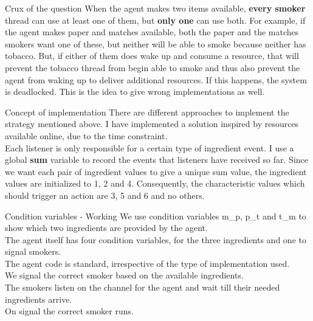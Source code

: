 \documentclass[dvipsnames]{beamer}
\theoremstyle{definition}
\begin{document}
\begin{frame}{Crux of the question}
When the agent makes two items available, \textbf{every smoker} thread can use at least one of them, but \textbf{only one} can use both. For example, if the agent makes paper and matches available, both the paper and the matches smokers want one of these, but neither will be able to smoke because neither has tobacco. But, if either of them does wake up and consume a resource, that will prevent the tobacco thread from begin able to smoke and thus also prevent the agent from waking up to deliver additional resources. If this happens, the system is deadlocked. This is the idea to give wrong implementations as well.
\end{frame}

\begin{frame}{Concept of implementation}
There are different approaches to implement the strategy mentioned above. I have implemented a solution inspired by resources available online, due to the time constraint. \\
Each listener is only responsible for a certain type of ingredient event. I use a global \textbf{sum} variable to record the events that listeners have received so far. Since we want each pair of ingredient values to give a unique sum value, the ingredient values are initialized to 1, 2 and 4. Consequently, the characteristic values which should trigger an action are 3, 5 and 6 and no others. 
\end{frame}

\begin{frame}{Condition variables - Working}
We use condition variables m\_p, p\_t and t\_m to show which two ingredients are provided by the agent.\\
The agent itself has four condition variables, for the three ingredients and one to signal smokers.\\
The agent code is standard, irrespective of the type of implementation used. \\
We signal the correct smoker based on the available ingredients. \\
The smokers listen on the channel for the agent and wait till their needed ingredients arrive. \\
On signal the correct smoker runs.
\end{frame}
\end{document}
